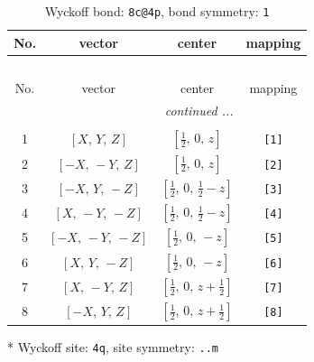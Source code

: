 \documentclass[fleqn,8pt]{jsarticle}
\begin{document}
\renewcommand{\arraystretch}{1.2}
\begin{longtable}{cccc}
\caption{Wyckoff bond: {\tt 8c@4p}, bond symmetry: {\tt 1}}
 \\
 \hline \hline
No. & vector & center & mapping \\ \hline \endfirsthead

\multicolumn{3}{l}{\tablename\ \thetable{}} \\
 \hline \hline
No. & vector & center & mapping \\ \hline \endhead

 \hline \hline
\multicolumn{3}{r}{\footnotesize\it continued ...} \\ \endfoot

 \hline \hline
\multicolumn{3}{r}{} \\ \endlastfoot

1 & $\left[ X,\, Y,\, Z \right]$ & $\left[ \frac{1}{2},\, 0,\, z \right]$ & {\tt [1]} \\ \hline
2 & $\left[ - X,\, - Y,\, Z \right]$ & $\left[ \frac{1}{2},\, 0,\, z \right]$ & {\tt [2]} \\ \hline
3 & $\left[ - X,\, Y,\, - Z \right]$ & $\left[ \frac{1}{2},\, 0,\, \frac{1}{2} - z \right]$ & {\tt [3]} \\ \hline
4 & $\left[ X,\, - Y,\, - Z \right]$ & $\left[ \frac{1}{2},\, 0,\, \frac{1}{2} - z \right]$ & {\tt [4]} \\ \hline
5 & $\left[ - X,\, - Y,\, - Z \right]$ & $\left[ \frac{1}{2},\, 0,\, - z \right]$ & {\tt [5]} \\ \hline
6 & $\left[ X,\, Y,\, - Z \right]$ & $\left[ \frac{1}{2},\, 0,\, - z \right]$ & {\tt [6]} \\ \hline
7 & $\left[ X,\, - Y,\, Z \right]$ & $\left[ \frac{1}{2},\, 0,\, z + \frac{1}{2} \right]$ & {\tt [7]} \\ \hline
8 & $\left[ - X,\, Y,\, Z \right]$ & $\left[ \frac{1}{2},\, 0,\, z + \frac{1}{2} \right]$ & {\tt [8]} \\
\end{longtable}
* Wyckoff site: {\tt 4q}, site symmetry: {\tt ..m}
\renewcommand{\arraystretch}{1.2}
\end{document}
